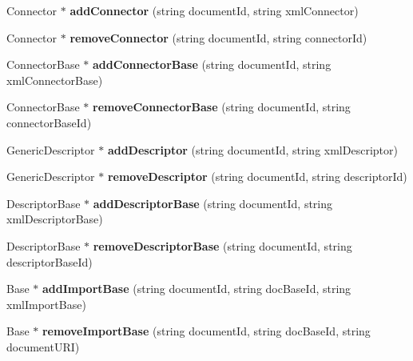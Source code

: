 \begin{CompactItemize}
\item 
Connector $\ast$ \textbf{addConnector} (string documentId, string xmlConnector)\label{classbr_1_1pucrio_1_1telemidia_1_1ginga_1_1ncl_1_1FormatterMediator_0129d574f8a1cfd4d2763ecb02daa0d7}

\item 
Connector $\ast$ \textbf{removeConnector} (string documentId, string connectorId)\label{classbr_1_1pucrio_1_1telemidia_1_1ginga_1_1ncl_1_1FormatterMediator_1af2765cc40affc56a032cb8ee3013bf}

\item 
ConnectorBase $\ast$ \textbf{addConnectorBase} (string documentId, string xmlConnectorBase)\label{classbr_1_1pucrio_1_1telemidia_1_1ginga_1_1ncl_1_1FormatterMediator_ae24f2e152451189e758150de62fa12a}

\item 
ConnectorBase $\ast$ \textbf{removeConnectorBase} (string documentId, string connectorBaseId)\label{classbr_1_1pucrio_1_1telemidia_1_1ginga_1_1ncl_1_1FormatterMediator_eadc9d5e322e934e9ab7db1b9f7c0436}

\item 
GenericDescriptor $\ast$ \textbf{addDescriptor} (string documentId, string xmlDescriptor)\label{classbr_1_1pucrio_1_1telemidia_1_1ginga_1_1ncl_1_1FormatterMediator_ce5a78d3e81f33420cb2ba391ec99948}

\item 
GenericDescriptor $\ast$ \textbf{removeDescriptor} (string documentId, string descriptorId)\label{classbr_1_1pucrio_1_1telemidia_1_1ginga_1_1ncl_1_1FormatterMediator_338c6b6118d0127b2d0c3baf65853a94}

\item 
DescriptorBase $\ast$ \textbf{addDescriptorBase} (string documentId, string xmlDescriptorBase)\label{classbr_1_1pucrio_1_1telemidia_1_1ginga_1_1ncl_1_1FormatterMediator_c0f903fe477853764170bcd07eb8103d}

\item 
DescriptorBase $\ast$ \textbf{removeDescriptorBase} (string documentId, string descriptorBaseId)\label{classbr_1_1pucrio_1_1telemidia_1_1ginga_1_1ncl_1_1FormatterMediator_1c5809c5f42f888e39696182aa4d5c02}

\item 
Base $\ast$ \textbf{addImportBase} (string documentId, string docBaseId, string xmlImportBase)\label{classbr_1_1pucrio_1_1telemidia_1_1ginga_1_1ncl_1_1FormatterMediator_5f390e05f5e0746ff24b3cc4277b3a02}

\item 
Base $\ast$ \textbf{removeImportBase} (string documentId, string docBaseId, string documentURI)\label{classbr_1_1pucrio_1_1telemidia_1_1ginga_1_1ncl_1_1FormatterMediator_24ac4045fc9659ea929263a8dae63fd6}


\end{CompactItemize}
